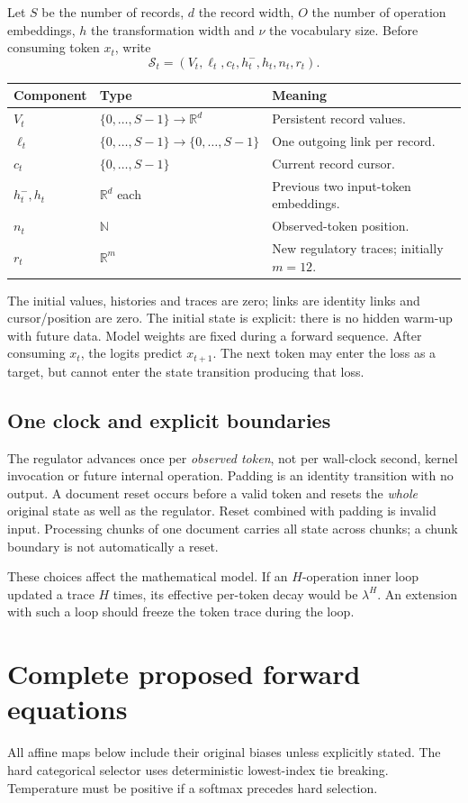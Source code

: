 \documentclass[11pt,a4paper]{article}
\newcommand{\R}{\mathbb{R}}
\begin{document}
Let \(S\) be the number of records, \(d\) the record width, \(O\) the number of
operation embeddings, \(h\) the transformation width and \(\nu\) the vocabulary
size. Before consuming token \(x_t\), write
\[
\mathcal S_t=(V_t,\ell_t,c_t,h^-_t,h_t,n_t,r_t).
\]
\begin{tabularx}{\linewidth}{@{}l l Y@{}}
\toprule
Component & Type & Meaning\\ \midrule
\(V_t\) & \(\{0,\ldots,S-1\}\to\R^d\) & Persistent record values.\\
\(\ell_t\) & \(\{0,\ldots,S-1\}\to\{0,\ldots,S-1\}\) & One outgoing link per record.\\
\(c_t\) & \(\{0,\ldots,S-1\}\) & Current record cursor.\\
\(h^-_t,h_t\) & \(\R^d\) each & Previous two input-token embeddings.\\
\(n_t\) & \(\mathbb N\) & Observed-token position.\\
\(r_t\) & \(\R^m\) & New regulatory traces; initially \(m=12\).\\
\bottomrule
\end{tabularx}

The initial values, histories and traces are zero; links are identity links and
cursor/position are zero. The initial state is explicit: there is no hidden
warm-up with future data. Model weights are fixed during a forward sequence.
After consuming \(x_t\), the logits predict \(x_{t+1}\). The next token may enter
the loss as a target, but cannot enter the state transition producing that loss.

\subsection{One clock and explicit boundaries}
The regulator advances once per \emph{observed token}, not per wall-clock second,
kernel invocation or future internal operation. Padding is an identity transition
with no output. A document reset occurs before a valid token and resets the
\emph{whole} original state as well as the regulator. Reset combined with padding
is invalid input. Processing chunks of one document carries all state across
chunks; a chunk boundary is not automatically a reset.

These choices affect the mathematical model. If an \(H\)-operation inner loop
updated a trace \(H\) times, its effective per-token decay would be \(\lambda^H\).
An extension with such a loop should freeze the token trace during the loop.

\section{Complete proposed forward equations}
All affine maps below include their original biases unless explicitly stated.
The hard categorical selector uses deterministic lowest-index tie breaking.
Temperature must be positive if a softmax precedes hard selection.
\end{document}

